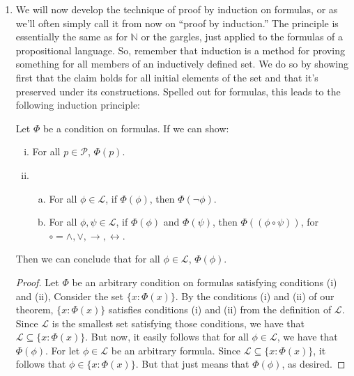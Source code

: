 	\begin{enumerate}[\thesection.1]

		\item We will now develop the technique of proof by induction on formulas, or as we'll often simply call it from now on ``proof by induction.'' The principle is essentially the same as for $\mathbb{N}$ or the gargles, just applied to the formulas of a propositional language. So, remember that induction is a method for proving something for all members of an inductively defined set. We do so by showing first that the claim holds for all initial elements of the set and that it's preserved under its constructions. Spelled out for formulas, this leads to the following induction principle:
		\begin{theorem}
		Let $\Phi$ be a condition on formulas. If we can show:
		\begin{enumerate}[(i)]
		
			\item For all $p\in\mathcal{P}$, $\Phi(p)$.
			
			\item \begin{enumerate}[(a)]
			
			\item For all $\phi\in\mathcal{L}$, if $\Phi(\phi)$, then $\Phi(\neg\phi)$.

			\item For all $\phi,\psi\in\mathcal{L}$, if $\Phi(\phi)$ and $\Phi(\psi)$, then $\Phi((\phi\circ\psi))$, for $\circ=\land,\lor,\to,\leftrightarrow$.
		
		\end{enumerate}
		\end{enumerate}
		Then we can conclude that for all $\phi\in\mathcal{L}$, $\Phi(\phi)$.
		\end{theorem}
		\begin{proof}
		Let $\Phi$ be an arbitrary condition on formulas satisfying conditions (i) and (ii), Consider the set $\{x:\Phi(x)\}$. By the conditions (i) and (ii) of our theorem, $\{x:\Phi(x)\}$ satisfies conditions (i) and (ii) from the definition of $\mathcal{L}$. Since $\mathcal{L}$ is the smallest set satisfying those conditions, we have that $\mathcal{L}\subseteq\{x:\Phi(x)\}$. But now, it easily follows that for all $\phi\in\mathcal{L}$, we have that $\Phi(\phi)$. For let $\phi\in\mathcal{L}$ be an arbitrary formula. Since $\mathcal{L}\subseteq\{x:\Phi(x)\}$, it follows that $\phi\in\{x:\Phi(x)\}$. But that just means that $\Phi(\phi)$, as desired.
		\end{proof}
		

\end{enumerate}
